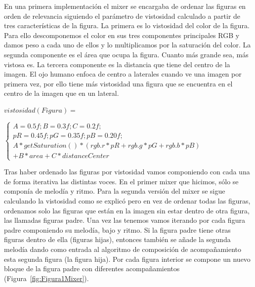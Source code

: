 En una primera implementación el mixer se encargaba de ordenar las figuras en orden de relevancia siguiendo el parámetro de vistosidad calculado a partir de tres características de la figura.
La primera es lo vistosidad del color de la figura. Para ello descomponemos el color en sus tres componentes principales RGB y damos peso a cada uno de ellos y lo multiplicamos por la saturación del color.
La segunda componente es el área que ocupa la figura. Cuanto más grande sea, más vistosa es.
La tercera componente es la distancia que tiene del centro de la imagen. El ojo humano enfoca de centro a laterales cuando ve una imagen por primera vez, por ello tiene más vistosidad una figura que se encuentra en el centro de la imagen que en un lateral.

	\begin{center}
		$vistosidad(Figura) =$
	\end{center}
	\begin{center}
		
		$\left\{
		\begin{array}{cc}
		A = 0.5f; B = 0.3f; C = 0.2f;\\ 
		pR = 0.45f; pG = 0.35f; pB = 0.20f;\\
		A*getSaturation()*(rgb.r*pR + rgb.g*pG + rgb.b*pB)\\
		 + B*area + C*distanceCenter
		\end{array}\right.$
	\end{center}

Tras haber ordenado las figuras por vistosidad vamos componiendo con cada una de forma iterativa las distintas voces. En el primer mixer que hicimos, sólo se componía  de melodía y ritmo. Para la segunda versión del mixer se sigue calculando la vistosidad como se explicó pero en vez de ordenar todas las figuras, ordenamos solo las figuras que están en la imagen sin estar dentro de otra figura, las llamadas figuras padre. Una vez las tenemos vamos iterando por cada figura padre componiendo su melodía, bajo y ritmo. Si la figura padre tiene otras figuras dentro de ella (figuras hijas), entonces también se añade la segunda melodía dando como entrada al algoritmo de composición de acompañamiento esta segunda figura (la figura hija). Por cada figura interior se compone un nuevo bloque de la figura padre con diferentes acompañamientos (Figura~\ref{fig:Figura1Mixer}).

